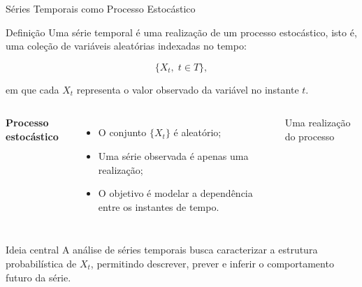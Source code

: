 \documentclass{beamer}
\begin{document}
    \begin{frame}{Séries Temporais como Processo Estocástico}

    \begin{block}{Definição}
    Uma série temporal é uma realização de um processo estocástico, isto é,
    uma coleção de variáveis aleatórias indexadas no tempo:

    \[
    \{X_t,\; t \in T\},
    \]

    em que cada \(X_t\) representa o valor observado da variável no instante \(t\).
    \end{block}

    \vspace{0.2cm}

    \begin{columns}[T]
    \textbf{Processo estocástico}

    \begin{itemize}
        \item O conjunto \(\{X_t\}\) é aleatório;
        \item Uma série observada é apenas uma realização;
        \item O objetivo é modelar a dependência entre os instantes de tempo.
    \end{itemize}

    \centering

    {\scriptsize Uma realização do processo}
    \end{columns}

    \vspace{0.3cm}

    \begin{alertblock}{Ideia central}
    A análise de séries temporais busca caracterizar a estrutura probabilística de
    \(X_t\), permitindo descrever, prever e inferir o comportamento futuro da série.
    \end{alertblock}

    \end{frame}
\end{document}
